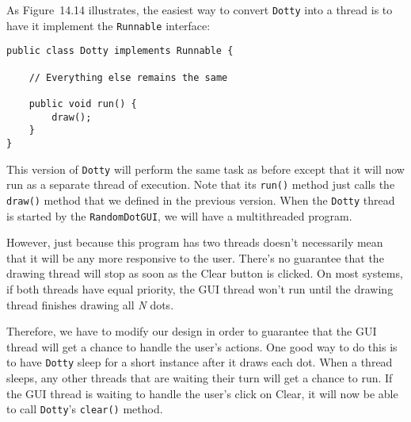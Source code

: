 As Figure~14.14 illustrates, the easiest way to convert
{\tt Dotty} into a thread is to have it implement the {\tt Runnable}
interface:

\begin{jjjlisting}
\begin{lstlisting}
public class Dotty implements Runnable {

    // Everything else remains the same

    public void run() {
        draw();
    }
}
\end{lstlisting}
\end{jjjlisting}

\noindent This version of {\tt Dotty} will perform the same task as before
except that it will now run as a separate thread of execution.  Note
that its {\tt run()} method just calls the {\tt draw()} method that we
defined in the previous version.   When the {\tt Dotty} thread is
started by the {\tt RandomDotGUI}, we will have a multithreaded
program.

However, just because this program has two threads doesn't
necessarily mean that it will be any more responsive to the user.
There's no guarantee that the drawing thread will stop as soon as the
Clear button is clicked.  On most systems, if both threads have
equal priority, the GUI thread won't run until the drawing thread
finishes drawing all {\it N} dots.



\noindent Therefore, we have to modify our design in order to guarantee that the
GUI thread will get a chance to handle the user's actions.   One
good way to do this is to have {\tt Dotty} sleep for a short
instance after it draws each dot.  When a thread sleeps, any other
threads that are waiting their turn will get a chance to run.  If the
GUI thread is waiting to handle the user's click on Clear, it
will now be able to call {\tt Dotty}'s {\tt clear()} method.

